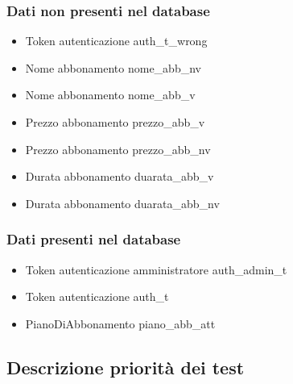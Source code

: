 \subsubsection*{Dati non presenti nel database}
\begin{itemize}
    \item Token autenticazione auth\_t\_wrong
    \item Nome abbonamento nome\_abb\_nv
    \item Nome abbonamento nome\_abb\_v
    \item Prezzo abbonamento prezzo\_abb\_v
    \item Prezzo abbonamento prezzo\_abb\_nv
    \item Durata abbonamento duarata\_abb\_v
    \item Durata abbonamento duarata\_abb\_nv

\end{itemize}

\subsubsection*{Dati presenti nel database}
\begin{itemize}
    \item Token autenticazione amministratore auth\_admin\_t
    \item Token autenticazione auth\_t
    \item PianoDiAbbonamento piano\_abb\_att

\end{itemize}

\subsection*{Descrizione priorità dei test}

